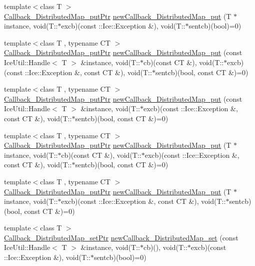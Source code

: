 \begin{DoxyCompactItemize}
\item 
{\footnotesize template$<$class T $>$ }\\\hyperlink{namespace_global_table_a652e5fcf9acdfd0d854019d109b9644a}{Callback\_\-DistributedMap\_\-putPtr} \hyperlink{namespace_global_table_ad3de1cea0da2fb9dfb7e2afbbc8577ca}{newCallback\_\-DistributedMap\_\-put} (T $\ast$instance, void(T::$\ast$excb)(const ::Ice::Exception \&), void(T::$\ast$sentcb)(bool)=0)
\item 
{\footnotesize template$<$class T , typename CT $>$ }\\\hyperlink{namespace_global_table_a652e5fcf9acdfd0d854019d109b9644a}{Callback\_\-DistributedMap\_\-putPtr} \hyperlink{namespace_global_table_a4392d24e7552100c5e4aa1aa033b28f7}{newCallback\_\-DistributedMap\_\-put} (const IceUtil::Handle$<$ T $>$ \&instance, void(T::$\ast$cb)(const CT \&), void(T::$\ast$excb)(const ::Ice::Exception \&, const CT \&), void(T::$\ast$sentcb)(bool, const CT \&)=0)
\item 
{\footnotesize template$<$class T , typename CT $>$ }\\\hyperlink{namespace_global_table_a652e5fcf9acdfd0d854019d109b9644a}{Callback\_\-DistributedMap\_\-putPtr} \hyperlink{namespace_global_table_a1b764a4b02bf17c9bc7c012febad04db}{newCallback\_\-DistributedMap\_\-put} (const IceUtil::Handle$<$ T $>$ \&instance, void(T::$\ast$excb)(const ::Ice::Exception \&, const CT \&), void(T::$\ast$sentcb)(bool, const CT \&)=0)
\item 
{\footnotesize template$<$class T , typename CT $>$ }\\\hyperlink{namespace_global_table_a652e5fcf9acdfd0d854019d109b9644a}{Callback\_\-DistributedMap\_\-putPtr} \hyperlink{namespace_global_table_a9e758916c769de44951344a42de701d4}{newCallback\_\-DistributedMap\_\-put} (T $\ast$instance, void(T::$\ast$cb)(const CT \&), void(T::$\ast$excb)(const ::Ice::Exception \&, const CT \&), void(T::$\ast$sentcb)(bool, const CT \&)=0)
\item 
{\footnotesize template$<$class T , typename CT $>$ }\\\hyperlink{namespace_global_table_a652e5fcf9acdfd0d854019d109b9644a}{Callback\_\-DistributedMap\_\-putPtr} \hyperlink{namespace_global_table_ab934b8c9e3f65a8f374cc9be304887c0}{newCallback\_\-DistributedMap\_\-put} (T $\ast$instance, void(T::$\ast$excb)(const ::Ice::Exception \&, const CT \&), void(T::$\ast$sentcb)(bool, const CT \&)=0)
\item 
{\footnotesize template$<$class T $>$ }\\\hyperlink{namespace_global_table_a8196b91ca3241e16fd9aac727da95e02}{Callback\_\-DistributedMap\_\-setPtr} \hyperlink{namespace_global_table_a1e634d2b1b68b363dabd3db9cc89bf42}{newCallback\_\-DistributedMap\_\-set} (const IceUtil::Handle$<$ T $>$ \&instance, void(T::$\ast$cb)(), void(T::$\ast$excb)(const ::Ice::Exception \&), void(T::$\ast$sentcb)(bool)=0)

\end{DoxyCompactItemize}
